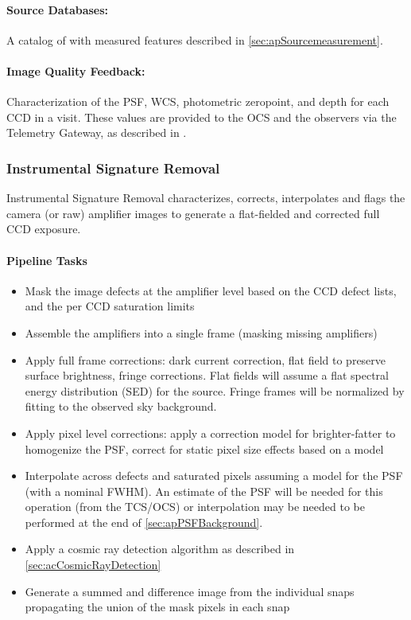 \paragraph*{Source Databases:} A catalog of \Sources with measured features described in \ref{sec:apSourcemeasurement}.

\paragraph*{Image Quality Feedback:} Characterization of the PSF, WCS, photometric zeropoint, and depth for each CCD in a visit. These values are provided to the OCS and the observers via the Telemetry Gateway, as described in .

\subsubsection{Instrumental Signature Removal}
\label{sec:apISR}
Instrumental Signature Removal characterizes, corrects, interpolates and flags the camera (or raw) amplifier images to generate a flat-fielded and corrected full CCD exposure.

\paragraph{Pipeline Tasks}
\begin{itemize}
\item Mask the image defects at the amplifier level based on the CCD defect lists, and the per CCD saturation limits
\item Assemble the amplifiers into a single frame (masking missing amplifiers)
\item Apply full frame corrections: dark current correction, flat field to preserve surface brightness, fringe corrections. Flat fields will assume a flat spectral energy distribution (SED) for the source. Fringe frames will be normalized by fitting to the observed sky background.
\item Apply pixel level corrections: apply a correction model for brighter-fatter to homogenize the PSF, correct for static pixel size effects based on a model
\item Interpolate across defects and saturated pixels assuming a model for the PSF (with a nominal FWHM). An estimate of the PSF will be needed for this operation (from the TCS/OCS) or interpolation may be needed to be performed at the end of \ref{sec:apPSFBackground}.
\item Apply a cosmic ray detection algorithm as described in \ref{sec:acCosmicRayDetection}
\item Generate a summed and difference image from the individual snaps propagating the union of the mask pixels in each snap
\end{itemize}

